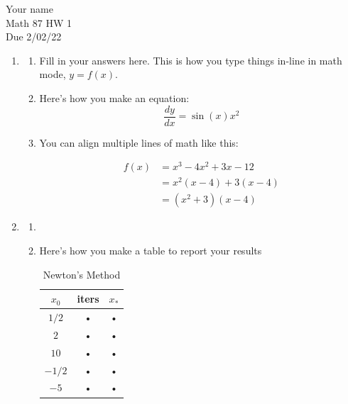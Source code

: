\documentclass[11pt]{article}
\begin{document}
\noindent Your name \\
Math 87 HW 1 \\
Due 2/02/22 

\hrulefill



\begin{enumerate}




\item 
\begin{enumerate}
\item Fill in your answers here. This is how you type things in-line in math mode, $y = f(x)$.


\item Here's how you make an equation:
	\begin{equation*}
	\frac{dy}{dx} = \sin(x) x^2 
	\end{equation*}


\item You can align multiple lines of math like this:

	\begin{align*}
	f(x) &= x^3 - 4x^2 + 3x - 12 \\
		&= x^2(x - 4) + 3(x-4) \\
		&= (x^2 + 3)(x-4)
	\end{align*}  


\end{enumerate}



\item  
\begin{enumerate} 
\item 
\item  Here's how you make a table to report your results \\

	\begin{table}[H]
	\begin{center}
	\begin{tabular}{|c|c|c|}
	\hline 
	$x_0$ & iters & $x_*$ \\ 
	\hline 
	$1/2$ & • & • \\ 
	\hline 
	$2$ & • & • \\ 
	\hline 
	$10$ & • & • \\ 
	\hline 
	$-1/2$ & • & • \\ 
	\hline 
	$-5$ & • & • \\ 
	\hline 
	\end{tabular} 
	\caption{Newton's Method}
	\end{center}
	\end{table}
	


\end{enumerate}
\end{enumerate}
\end{document}
